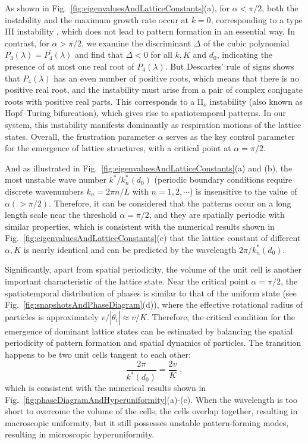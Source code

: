 \documentclass{article}
\begin{document}
As shown in Fig.~\ref{fig:eigenvaluesAndLatticeConstants}(a), for $\alpha < \pi/2$, both the instability and the maximum growth rate occur at $k=0$, corresponding to a type III instability \cite{RevModPhys.65.851}, which does not lead to pattern formation in an essential way. 
In contrast, for $\alpha > \pi/2$, we examine the discriminant $\Delta$ of the cubic polynomial $P_3(\lambda)=P_4^{\prime}(\lambda)$ and find that $\Delta <0$ for all $k, K$ and $d_0$, indicating the presence of at most one real root of $P_4(\lambda)$.
But Descartes' rule of signs shows that $P_4(\lambda)$ has an even number of positive roots, which means that there is no positive real root, and the instability must arise from a pair of complex conjugate roots with positive real parts.
This corresponds to a II$_o$ instability (also known as Hopf–Turing bifurcation), which gives rise to spatiotemporal patterns. In our system, this instability manifests dominantly as respiration motions of the lattice states. Overall, the frustration parameter $\alpha$ serves as the key control parameter for the emergence of lattice structures, with a critical point at $\alpha = \pi/2$.

And as illustrated in Fig.~\ref{fig:eigenvaluesAndLatticeConstants}(a) and (b), the most unstable wave number $k^{*}/k^{*}_n(d_0)$ (periodic boundary conditions require discrete wavenumbers $k_n=2\pi n/L$ with $n=1,2,\cdots$) is insensitive to the value of $\alpha (>\pi/2)$. 
Therefore, it can be considered that the patterns occur on a long length scale near the threshold $\alpha = \pi/2$, and they are spatially periodic with similar properties, which is consistent with the numerical results shown in Fig.~\ref{fig:eigenvaluesAndLatticeConstants}(c) that the lattice constant of different $\alpha, K$ is nearly identical and can be predicted by the wavelength $2\pi/k^{*}_n(d_0)$.

Significantly, apart from spatial periodicity, the volume of the unit cell is another important characteristic of the lattice state. 
Near the critical point $\alpha = \pi/2$, the spatiotemporal distribution of phases is similar to that of the uniform state (see Fig.~\ref{fig:snapshotsAndPhaseDiagram}(d)), where the effective rotational radius of particles is approximately $v/|\dot{\theta}_i| \approx v/K$.
Therefore, the critical condition for the emergence of dominant lattice states can be estimated by balancing the spatial periodicity of pattern formation and spatial dynamics of particles. The transition happens to be two unit cells tangent to each other:
\begin{equation}
    \frac{2\pi}{k^*\left( d_0 \right)}=\frac{2v}{K}\;,
    \label{eq:criticalLineOfKD0}
\end{equation}
which is consistent with the numerical results shown in Fig.~\ref{fig:phaseDiagramAndHyperuniformity}(a)-(c). When the wavelength is too short to overcome the volume of the cells, the cells overlap together, resulting in macroscopic uniformity, but it still possesses unstable pattern-forming modes, resulting in microscopic hyperuniformity.
\end{document}
